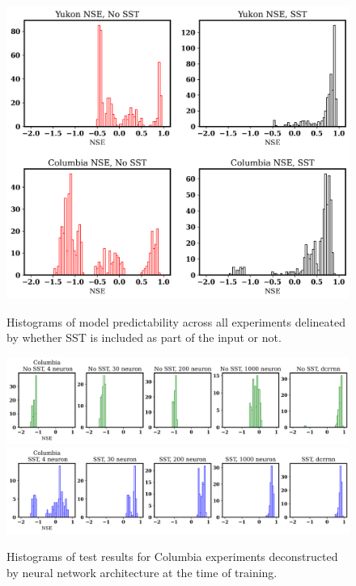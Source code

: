 \begin{figure}[!ht]
	\centering
    \caption{Histograms of model predictability across all experiments delineated by whether SST is included as part of the input or not.}
	\includegraphics[width=1.0\linewidth]{m3/ims/fig3_4.png}
 	\label{fig3_4}
\end{figure}

\begin{figure}[!ht]
	\centering
    \caption{Histograms of test results for Columbia experiments deconstructed by neural network architecture at the time of training.}
	\includegraphics[width=1.0\linewidth]{m3/ims/fig3_5a.png}
    \includegraphics[width=1.0\linewidth]{m3/ims/fig3_5b.png}
    \label{fig3_5}
\end{figure}

